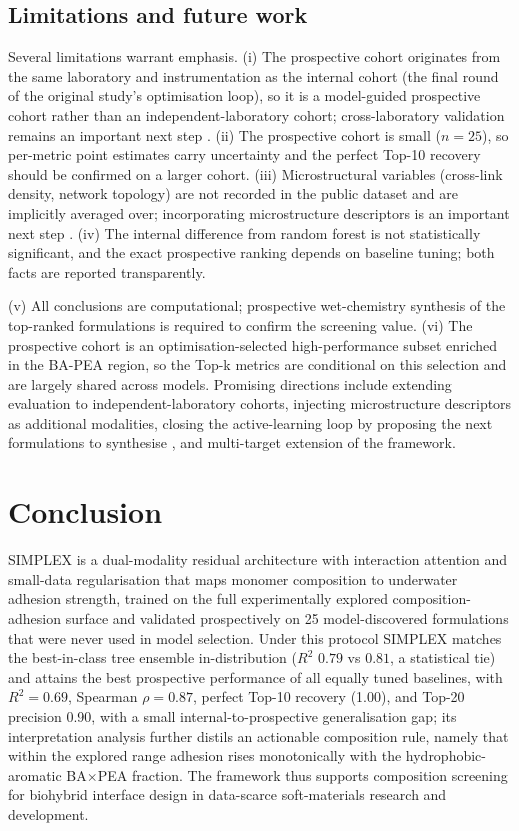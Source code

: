 \documentclass[utf8]{FrontiersinHarvard}
\begin{document}
\subsection{Limitations and future work}

Several limitations warrant emphasis. (i) The prospective cohort originates from the same laboratory and instrumentation as the internal cohort (the final round of the original study's optimisation loop), so it is a model-guided prospective cohort rather than an independent-laboratory cohort; cross-laboratory validation remains an important next step \cite{liao2025nature}. (ii) The prospective cohort is small ($n = 25$), so per-metric point estimates carry uncertainty and the perfect Top-10 recovery should be confirmed on a larger cohort. (iii) Microstructural variables (cross-link density, network topology) are not recorded in the public dataset and are implicitly averaged over; incorporating microstructure descriptors is an important next step \cite{kim2023smallML,agrawal2016mlmaterials,isayev2017mlmaterials,zitnick2020materials}. (iv) The internal difference from random forest is not statistically significant, and the exact prospective ranking depends on baseline tuning; both facts are reported transparently.

(v) All conclusions are computational; prospective wet-chemistry synthesis of the top-ranked formulations is required to confirm the screening value. (vi) The prospective cohort is an optimisation-selected high-performance subset enriched in the BA-PEA region, so the Top-k metrics are conditional on this selection and are largely shared across models. Promising directions include extending evaluation to independent-laboratory cohorts, injecting microstructure descriptors as additional modalities, closing the active-learning loop by proposing the next formulations to synthesise \cite{chen2022activelearning}, and multi-target extension of the framework.

\section{Conclusion}

SIMPLEX is a dual-modality residual architecture with interaction attention and small-data regularisation that maps monomer composition to underwater adhesion strength, trained on the full experimentally explored composition-adhesion surface and validated prospectively on 25 model-discovered formulations that were never used in model selection. Under this protocol SIMPLEX matches the best-in-class tree ensemble in-distribution ($R^2$ $0.79$ vs $0.81$, a statistical tie) and attains the best prospective performance of all equally tuned baselines, with $R^2 = 0.69$, Spearman $\rho = 0.87$, perfect Top-10 recovery (1.00), and Top-20 precision 0.90, with a small internal-to-prospective generalisation gap; its interpretation analysis further distils an actionable composition rule, namely that within the explored range adhesion rises monotonically with the hydrophobic-aromatic BA$\times$PEA fraction. The framework thus supports composition screening for biohybrid interface design in data-scarce soft-materials research and development.
\end{document}
